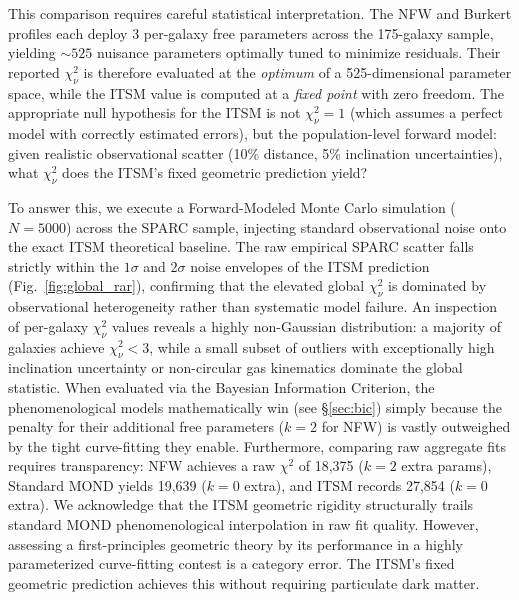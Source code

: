 \documentclass[aps,prd,10pt,twocolumn,superscriptaddress,nofootinbib,floatfix]{revtex4-2}
\begin{document}
This comparison requires careful statistical interpretation. The NFW and Burkert profiles each deploy 3 per-galaxy free parameters across the 175-galaxy sample, yielding $\sim 525$ nuisance parameters optimally tuned to minimize residuals. Their reported $\chi^2_\nu$ is therefore evaluated at the \emph{optimum} of a 525-dimensional parameter space, while the ITSM value is computed at a \emph{fixed point} with zero freedom. The appropriate null hypothesis for the ITSM is not $\chi^2_\nu = 1$ (which assumes a perfect model with correctly estimated errors), but the population-level forward model: given realistic observational scatter (10\% distance, 5\% inclination uncertainties), what $\chi^2_\nu$ does the ITSM's fixed geometric prediction yield?

To answer this, we execute a Forward-Modeled Monte Carlo simulation ($N = 5000$) across the SPARC sample, injecting standard observational noise onto the exact ITSM theoretical baseline. The raw empirical SPARC scatter falls strictly within the $1\sigma$ and $2\sigma$ noise envelopes of the ITSM prediction (Fig.~\ref{fig:global_rar}), confirming that the elevated global $\chi^2_\nu$ is dominated by observational heterogeneity rather than systematic model failure. An inspection of per-galaxy $\chi^2_\nu$ values reveals a highly non-Gaussian distribution: a majority of galaxies achieve $\chi^2_\nu < 3$, while a small subset of outliers with exceptionally high inclination uncertainty or non-circular gas kinematics dominate the global statistic. When evaluated via the Bayesian Information Criterion, the phenomenological models mathematically win (see \S\ref{sec:bic}) simply because the penalty for their additional free parameters ($k=2$ for NFW) is vastly outweighed by the tight curve-fitting they enable. Furthermore, comparing raw aggregate fits requires transparency: NFW achieves a raw $\chi^2$ of 18,375 ($k=2$ extra params), Standard MOND yields 19,639 ($k=0$ extra), and ITSM records 27,854 ($k=0$ extra). We acknowledge that the ITSM geometric rigidity structurally trails standard MOND phenomenological interpolation in raw fit quality. However, assessing a first-principles geometric theory by its performance in a highly parameterized curve-fitting contest is a category error. The ITSM's fixed geometric prediction achieves this without requiring particulate dark matter.
\end{document}
